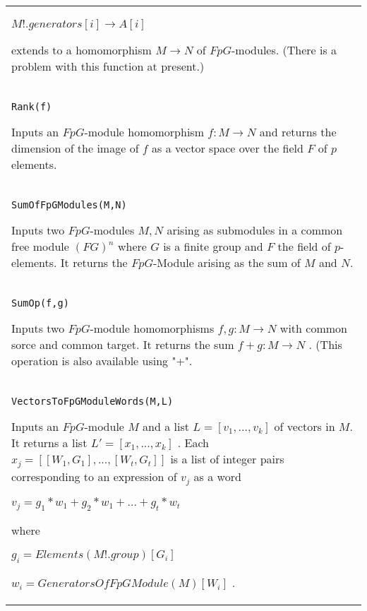 \documentclass[a4paper,11pt]{report}
\begin{document}
{\begin{center}
\begin{tabular}{|l|}
 $ M!.generators[i] \longrightarrow A[i]$ 

 extends to a homomorphism $M \longrightarrow N$ of $FpG$-modules. (There is a problem with this function at present.) \\
 \index{Rank} \texttt{Rank(f) } 

 Inputs an $FpG$-module homomorphism $f:M \longrightarrow N$ and returns the dimension of the image of $f$ as a vector space over the field $F$ of $p$ elements. \\
 \index{SumOfFpGModules} \texttt{SumOfFpGModules(M,N) } 

 Inputs two $FpG$-modules $M, N$ arising as submodules in a common free module $(FG)^n$ where $G$ is a finite group and $F$ the field of $p$-elements. It returns the $FpG$-Module arising as the sum of $M$ and $N$. \\
 \index{SumOp} \texttt{SumOp(f,g) } 

 Inputs two $FpG$-module homomorphisms $f,g:M \longrightarrow N$ with common sorce and common target. It returns the sum $f+g:M \longrightarrow N$ . (This operation is also available using "+". \\
 \index{VectorsToFpGModuleWords} \texttt{VectorsToFpGModuleWords(M,L) } 

 Inputs an $FpG$-module $M$ and a list $L=[v_1,\ldots ,v_k]$ of vectors in $M$. It returns a list $L'= [x_1,...,x_k]$ . Each $x_j=[[W_1,G_1],...,[W_t,G_t]]$ is a list of integer pairs corresponding to an expression of $v_j$ as a word 

 $ v_j = g_1*w_1 + g_2*w_1 + ... + g_t*w_t $ 

 where 

 $g_i=Elements(M!.group)[G_i]$ 

 $w_i=GeneratorsOfFpGModule(M)[W_i]$ . \\
\end{tabular}\\[2mm]
\end{center}

 }

 
\end{document}
